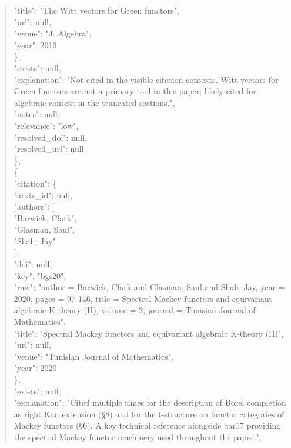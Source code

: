 \documentclass[11pt]{article}
\begin{document}
\begin{quote}
        "title": "The Witt vectors for Green functors",\\
        "url": null,\\
        "venue": "J. Algebra",\\
        "year": 2019\\
      \},\\
      "exists": null,\\
      "explanation": "Not cited in the visible citation contexts. Witt vectors for Green functors are not a primary tool in this paper; likely cited for algebraic context in the truncated sections.",\\
      "notes": null,\\
      "relevance": "low",\\
      "resolved\_doi": null,\\
      "resolved\_url": null\\
    \},\\
    \{\\
      "citation": \{\\
        "arxiv\_id": null,\\
        "authors": [\\
          "Barwick, Clark",\\
          "Glasman, Saul",\\
          "Shah, Jay"\\
        ],\\
        "doi": null,\\
        "key": "bgs20",\\
        "raw": "author = Barwick, Clark and Glasman, Saul and Shah, Jay, year = 2020, pages = 97-146, title = Spectral Mackey functors and equivariant algebraic K-theory (II), volume = 2, journal = Tunisian Journal of Mathematics",\\
        "title": "Spectral Mackey functors and equivariant algebraic K-theory (II)",\\
        "url": null,\\
        "venue": "Tunisian Journal of Mathematics",\\
        "year": 2020\\
      \},\\
      "exists": null,\\
      "explanation": "Cited multiple times for the description of Borel completion as right Kan extension (§8) and for the t-structure on functor categories of Mackey functors (§6). A key technical reference alongside bar17 providing the spectral Mackey functor machinery used throughout the paper.",\\

\end{quote}
\end{document}
